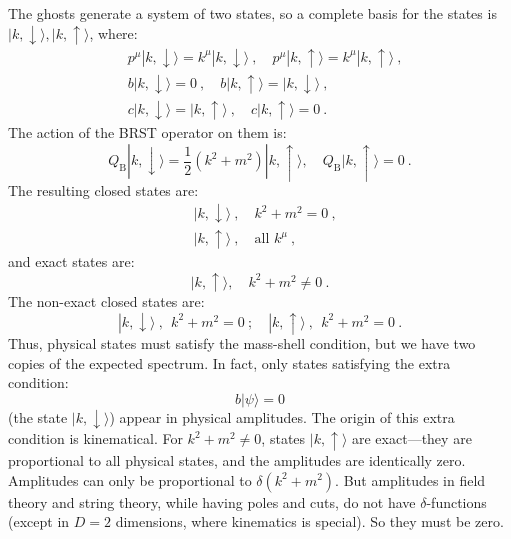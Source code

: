 The ghosts generate a system of two states, so a complete basis for the states is $|k, \downarrow\rangle,|k, \uparrow\rangle$, where:
\begin{subequations} \label{4.2.28}
	\begin{align}
		&p^{\mu}|k, \downarrow\rangle=k^{\mu}|k, \downarrow\rangle\:, \quad p^{\mu}|k, \uparrow\rangle=k^{\mu}|k, \uparrow\rangle \:, \label{4.2.28a}\\
		&b|k, \downarrow\rangle=0\:, \quad b|k, \uparrow\rangle=|k, \downarrow\rangle \:, \label{4.2.28b}\\
		&c|k, \downarrow\rangle=|k, \uparrow\rangle \:, \quad c|k, \uparrow\rangle=0 \:. \label{4.2.28c}
	\end{align}
\end{subequations}
The action of the BRST operator on them is:
\begin{equation}
	Q_{\mathrm{B}}|k, \downarrow\rangle=\frac{1}{2}(k^{2}+m^{2})|k, \uparrow\rangle, \quad Q_{\mathrm{B}}|k, \uparrow\rangle=0 \:. \label{4.2.29}
\end{equation}
The resulting closed states are:
\begin{subequations} \label{4.2.30}
	\begin{align}
		&|k, \downarrow\rangle \:, \quad k^{2}+m^{2}=0  \:, \label{4.2.30a} \\
		&|k, \uparrow\rangle \:, \quad \text {all } k^{\mu} \:, \label{4.2.30b}
	\end{align}
\end{subequations}
and exact states are:
\begin{equation}
	|k, \uparrow\rangle, \quad k^{2}+m^{2} \neq 0 \:. \label{4.2.31}
\end{equation}
The non-exact closed states are:
\begin{equation}
	|k, \downarrow\rangle\:,\:\: k^{2}+m^{2}=0 \: ; \quad|k, \uparrow\rangle\:,\:\: k^{2}+m^{2}=0 \:. \label{4.2.32}
\end{equation}
Thus, physical states must satisfy the mass-shell condition, but we have two copies of the expected spectrum. In fact, only states satisfying the extra condition:
\begin{equation}
	b|\psi\rangle=0  \label{4.2.33}
\end{equation}
(the state $|k, \downarrow\rangle$) appear in physical amplitudes. The origin of this extra condition is kinematical. For $k^{2}+m^{2} \neq 0$, states $|k, \uparrow\rangle$ are exact—they are proportional to all physical states, and the amplitudes are identically zero. Amplitudes can only be proportional to $\delta(k^{2}+m^{2})$. But amplitudes in field theory and string theory, while having poles and cuts, do not have $\delta$-functions (except in $D=2$ dimensions, where kinematics is special). So they must be zero.

